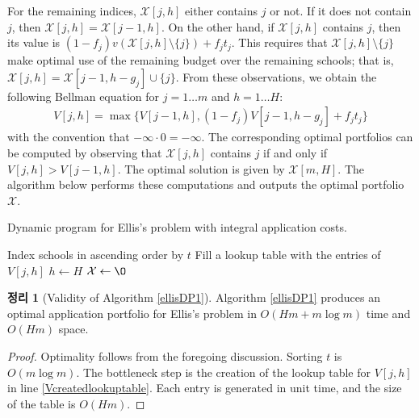 \documentclass[12pt]{article} %
\newtheorem{theorem}{Theorem}
\theoremstyle{definition}
\newtheorem{theorem}{정리}
\theoremstyle{definition}
\begin{document}
For the remaining indices, $\mathcal{X}[j, h]$ either contains $j$ or not. If it does not contain $j$, then $\mathcal{X}[j, h] = \mathcal{X}[j-1, h]$. On the other hand, if  $\mathcal{X}[j, h]$ contains $j$, then its value is $(1 - f_j) v(\mathcal{X}[j, h]\setminus \{j\}) + f_j t_j$. This requires that $\mathcal{X}[j, h]\setminus \{j\}$ make optimal use of the remaining budget over the remaining schools; that is, $\mathcal{X}[j, h] = \mathcal{X}[j-1, h - g_j] \cup\{j\}$. From these observations, we obtain the following Bellman equation for $ j = 1\dots m$ and $h = 1\dots H$:
\begin{align}
V[j, h] = \max\bigl\{ V[j-1, h], (1 - f_j) V[j-1, h-g_j] + f_j t_j \bigr\}
\end{align}
with the convention that $ -\infty \cdot 0 = -\infty$. The corresponding optimal portfolios can be computed by observing that $\mathcal{X}[j, h]$ contains $j$ if and only if $V[j, h]> V[j-1, h]$. The optimal solution is given by $\mathcal{X}[m, H]$. The algorithm below performs these computations and outputs the optimal portfolio $\mathcal{X}$. 

\begin{algorithm}[H] 
\caption{Dynamic program for Ellis's problem with integral application costs.} \label{ellisDP1}
\KwData{Utility values $t \in[0, \infty)^m$, admissions probabilities $f \in [0, 1]^m$, application costs $g \in \mathbb{N}^m$, budget $H \in\mathbb{N}$.}
Index schools in ascending order by $t$\;
Fill a lookup table with the entries of $V[j, h]$\; \label{Vcreatedlookuptable}
$h \gets H$\;
$\mathcal{X} \gets \O$\;
\end{algorithm}

\begin{theorem}[Validity of Algorithm \ref{ellisDP1}]
Algorithm \ref{ellisDP1} produces an optimal application portfolio for Ellis's problem in $O(H m + m \log m)$ time and $O(H m)$ space.
\end{theorem}

\begin{proof}
Optimality follows from the foregoing discussion. Sorting $t$ is $O(m \log m)$. The bottleneck step is the creation of the lookup table for $V[j, h]$ in line \ref{Vcreatedlookuptable}. Each entry is generated in unit time, and the size of the table is $O(Hm)$. 
\end{proof}
\end{document}
